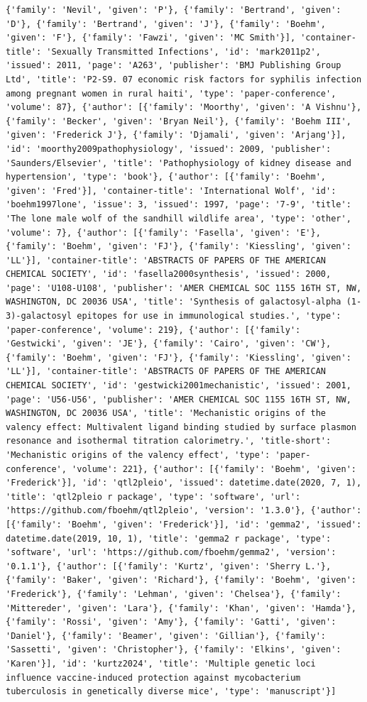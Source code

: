 \documentclass[
  12pt,
]
{article}
\begin{document}
\begin{verbatim}
{'family': 'Nevil', 'given': 'P'}, {'family': 'Bertrand', 'given': 'D'}, {'family': 'Bertrand', 'given': 'J'}, {'family': 'Boehm', 'given': 'F'}, {'family': 'Fawzi', 'given': 'MC Smith'}], 'container-title': 'Sexually Transmitted Infections', 'id': 'mark2011p2', 'issued': 2011, 'page': 'A263', 'publisher': 'BMJ Publishing Group Ltd', 'title': 'P2-S9. 07 economic risk factors for syphilis infection among pregnant women in rural haiti', 'type': 'paper-conference', 'volume': 87}, {'author': [{'family': 'Moorthy', 'given': 'A Vishnu'}, {'family': 'Becker', 'given': 'Bryan Neil'}, {'family': 'Boehm III', 'given': 'Frederick J'}, {'family': 'Djamali', 'given': 'Arjang'}], 'id': 'moorthy2009pathophysiology', 'issued': 2009, 'publisher': 'Saunders/Elsevier', 'title': 'Pathophysiology of kidney disease and hypertension', 'type': 'book'}, {'author': [{'family': 'Boehm', 'given': 'Fred'}], 'container-title': 'International Wolf', 'id': 'boehm1997lone', 'issue': 3, 'issued': 1997, 'page': '7-9', 'title': 'The lone male wolf of the sandhill wildlife area', 'type': 'other', 'volume': 7}, {'author': [{'family': 'Fasella', 'given': 'E'}, {'family': 'Boehm', 'given': 'FJ'}, {'family': 'Kiessling', 'given': 'LL'}], 'container-title': 'ABSTRACTS OF PAPERS OF THE AMERICAN CHEMICAL SOCIETY', 'id': 'fasella2000synthesis', 'issued': 2000, 'page': 'U108-U108', 'publisher': 'AMER CHEMICAL SOC 1155 16TH ST, NW, WASHINGTON, DC 20036 USA', 'title': 'Synthesis of galactosyl-alpha (1-3)-galactosyl epitopes for use in immunological studies.', 'type': 'paper-conference', 'volume': 219}, {'author': [{'family': 'Gestwicki', 'given': 'JE'}, {'family': 'Cairo', 'given': 'CW'}, {'family': 'Boehm', 'given': 'FJ'}, {'family': 'Kiessling', 'given': 'LL'}], 'container-title': 'ABSTRACTS OF PAPERS OF THE AMERICAN CHEMICAL SOCIETY', 'id': 'gestwicki2001mechanistic', 'issued': 2001, 'page': 'U56-U56', 'publisher': 'AMER CHEMICAL SOC 1155 16TH ST, NW, WASHINGTON, DC 20036 USA', 'title': 'Mechanistic origins of the valency effect: Multivalent ligand binding studied by surface plasmon resonance and isothermal titration calorimetry.', 'title-short': 'Mechanistic origins of the valency effect', 'type': 'paper-conference', 'volume': 221}, {'author': [{'family': 'Boehm', 'given': 'Frederick'}], 'id': 'qtl2pleio', 'issued': datetime.date(2020, 7, 1), 'title': 'qtl2pleio r package', 'type': 'software', 'url': 'https://github.com/fboehm/qtl2pleio', 'version': '1.3.0'}, {'author': [{'family': 'Boehm', 'given': 'Frederick'}], 'id': 'gemma2', 'issued': datetime.date(2019, 10, 1), 'title': 'gemma2 r package', 'type': 'software', 'url': 'https://github.com/fboehm/gemma2', 'version': '0.1.1'}, {'author': [{'family': 'Kurtz', 'given': 'Sherry L.'}, {'family': 'Baker', 'given': 'Richard'}, {'family': 'Boehm', 'given': 'Frederick'}, {'family': 'Lehman', 'given': 'Chelsea'}, {'family': 'Mittereder', 'given': 'Lara'}, {'family': 'Khan', 'given': 'Hamda'}, {'family': 'Rossi', 'given': 'Amy'}, {'family': 'Gatti', 'given': 'Daniel'}, {'family': 'Beamer', 'given': 'Gillian'}, {'family': 'Sassetti', 'given': 'Christopher'}, {'family': 'Elkins', 'given': 'Karen'}], 'id': 'kurtz2024', 'title': 'Multiple genetic loci influence vaccine-induced protection against mycobacterium tuberculosis in genetically diverse mice', 'type': 'manuscript'}]

\end{verbatim}
\end{document}
